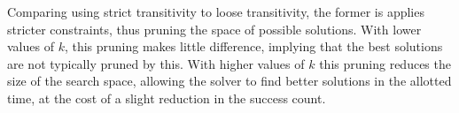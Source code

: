 Comparing using strict transitivity to loose transitivity, the former is applies stricter constraints, thus pruning the space of possible solutions. With lower values of $k$, this pruning makes little difference, implying that the best solutions are not typically pruned by this. With higher values of $k$ this pruning reduces the size of the search space, allowing the solver to find better solutions in the allotted time, at the cost of a slight reduction in the success count. 



